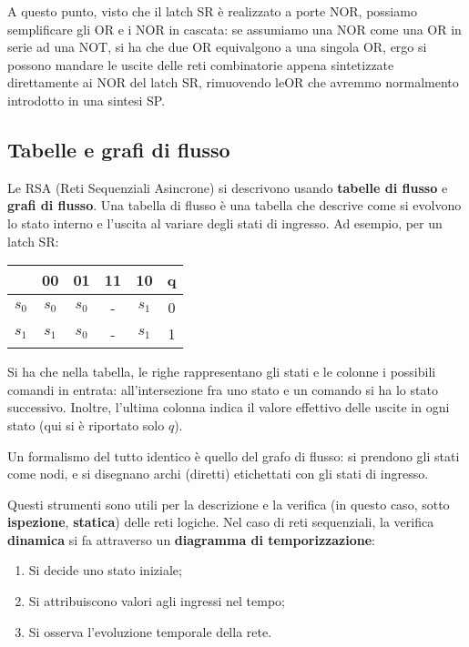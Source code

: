 \documentclass[a4paper,11pt]{article}
\begin{document}
A questo punto, visto che il latch SR è realizzato a porte NOR, possiamo semplificare gli OR e i NOR in cascata: se assumiamo una NOR come una OR in serie ad una NOT, si ha che due OR equivalgono a una singola OR, ergo si possono mandare le uscite delle reti combinatorie appena sintetizzate direttamente ai NOR del latch SR, rimuovendo leOR che avremmo normalmento introdotto in una sintesi SP. 

\subsection{Tabelle e grafi di flusso}
Le RSA (Reti Sequenziali Asincrone) si descrivono usando \textbf{tabelle di flusso} e \textbf{grafi di flusso}.
Una tabella di flusso è una tabella che descrive come si evolvono lo stato interno e l'uscita al variare degli stati di ingresso.
Ad esempio, per un latch SR:

\begin{table}[h!]
	\center 
	\begin{tabular} { c | c | c | c | c || c }
		& 00 & 01 & 11 & 10 & q \\ 
		\hline 
		$s_0$ & $s_0$ & $s_0$ & - & $s_1$ & 0 \\ 
		$s_1$ & $s_1$ & $s_0$ & - & $s_1$ & 1\\
	\end{tabular}
\end{table}

Si ha che nella tabella, le righe rappresentano gli stati e le colonne i possibili comandi in entrata: all'intersezione fra uno stato e un comando si ha lo stato successivo.
Inoltre, l'ultima colonna indica il valore effettivo delle uscite in ogni stato (qui si è riportato solo $q$).

Un formalismo del tutto identico è quello del grafo di flusso: si prendono gli stati come nodi, e si disegnano archi (diretti) etichettati con gli stati di ingresso. \TODO %

Questi strumenti sono utili per la descrizione e la verifica (in questo caso, sotto \textbf{ispezione}, \textbf{statica}) delle reti logiche.
Nel caso di reti sequenziali, la verifica \textbf{dinamica} si fa attraverso un \textbf{diagramma di temporizzazione}: 
\begin{enumerate}
	\item Si decide uno stato iniziale;
	\item Si attribuiscono valori agli ingressi nel tempo;
	\item Si osserva l'evoluzione temporale della rete.
\end{enumerate}
\end{document}
